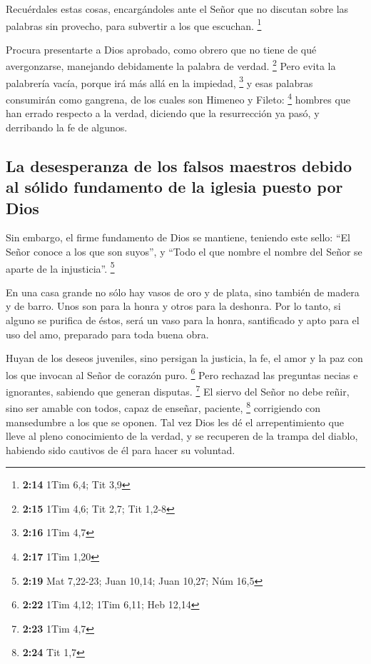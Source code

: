  Recuérdales estas cosas, encargándoles ante el Señor que
no discutan sobre las palabras sin provecho, para subvertir a los que
escuchan. \footnote{\textbf{2:14} 1Tim 6,4; Tit 3,9}

 Procura presentarte a Dios aprobado, como obrero que no
tiene de qué avergonzarse, manejando debidamente la palabra de verdad.
\footnote{\textbf{2:15} 1Tim 4,6; Tit 2,7; Tit 1,2-8} 
Pero evita la palabrería vacía, porque irá más allá en la impiedad,
\footnote{\textbf{2:16} 1Tim 4,7}  y esas palabras
consumirán como gangrena, de los cuales son Himeneo y Fileto:
\footnote{\textbf{2:17} 1Tim 1,20}  hombres que han
errado respecto a la verdad, diciendo que la resurrección ya pasó, y
derribando la fe de algunos.

\hypertarget{la-desesperanza-de-los-falsos-maestros-debido-al-suxf3lido-fundamento-de-la-iglesia-puesto-por-dios}{%
\subsection{La desesperanza de los falsos maestros debido al sólido
fundamento de la iglesia puesto por
Dios}\label{la-desesperanza-de-los-falsos-maestros-debido-al-suxf3lido-fundamento-de-la-iglesia-puesto-por-dios}}

 Sin embargo, el firme fundamento de Dios se mantiene,
teniendo este sello: ``El Señor conoce a los que son suyos'', y ``Todo
el que nombre el nombre del Señor se aparte de la injusticia''.
\footnote{\textbf{2:19} Mat 7,22-23; Juan 10,14; Juan 10,27; Núm 16,5}

 En una casa grande no sólo hay vasos de oro y de plata,
sino también de madera y de barro. Unos son para la honra y otros para
la deshonra.  Por lo tanto, si alguno se purifica de
éstos, será un vaso para la honra, santificado y apto para el uso del
amo, preparado para toda buena obra.

 Huyan de los deseos juveniles, sino persigan la
justicia, la fe, el amor y la paz con los que invocan al Señor de
corazón puro. \footnote{\textbf{2:22} 1Tim 4,12; 1Tim 6,11; Heb 12,14}
 Pero rechazad las preguntas necias e ignorantes,
sabiendo que generan disputas. \footnote{\textbf{2:23} 1Tim 4,7}
 El siervo del Señor no debe reñir, sino ser amable con
todos, capaz de enseñar, paciente, \footnote{\textbf{2:24} Tit 1,7}
 corrigiendo con mansedumbre a los que se oponen. Tal vez
Dios les dé el arrepentimiento que lleve al pleno conocimiento de la
verdad,  y se recuperen de la trampa del diablo, habiendo
sido cautivos de él para hacer su voluntad.

